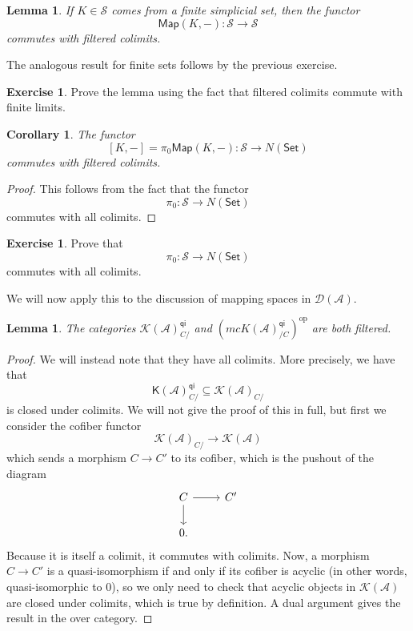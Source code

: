 \documentclass[10pt, oneside]{memoir}
\newtheorem{cor}[thm]{Corollary}
\newtheorem{lem}[thm]{Lemma}
\theoremstyle{definition}
\newtheorem{exer}[thm]{Exercise}
\theoremstyle{remark}
\theoremstyle{plain}
\theoremstyle{definition}
\theoremstyle{remark}
\newcommand{\mc}[1]{\mathcal{#1}}
\newcommand{\ms}[1]{\mathsf{#1}}
\newcommand{\1}{\mathbf{1}}
\newcommand{\2}{\mathbf{2}}
\newcommand{\3}{\mathbf{3}}
\DeclareMathOperator{\op}{op}
\begin{document}
\begin{lem}
    If $K \in \mc{S}$ comes from a finite simplicial set, then the functor
    \[ \ms{Map}(K, -) \colon \mc{S} \to \mc{S} \]
    commutes with filtered colimits.
\end{lem}

The analogous result for finite sets follows by the previous exercise.

\begin{exer}
    Prove the lemma using the fact that filtered colimits commute with finite limits.
\end{exer}

\begin{cor}
    The functor
    \[ [K,-] = \pi_0 \ms{Map}(K, -) \colon \mc{S} \to N(\ms{Set}) \]
    commutes with filtered colimits.
\end{cor}

\begin{proof}
    This follows from the fact that the functor
    \[ \pi_0 \colon \mc{S} \to N(\ms{Set}) \]
    commutes with all colimits.
\end{proof}

\begin{exer}
    Prove that
    \[ \pi_0 \colon \mc{S} \to N(\ms{Set}) \]
    commutes with all colimits.
\end{exer}

We will now apply this to the discussion of mapping spaces in $\mc{D}(\mc{A})$.

\begin{lem}
    The categories $\mc{K}(\mc{A})_{C/}^{\ms{qi}}$ and $(mc{K}(\mc{A})_{/C}^{\ms{qi}})^{\op}$ are both filtered.
\end{lem}

\begin{proof}
    We will instead note that they have all colimits. More precisely, we have that
    \[ \ms{K}(\mc{A})_{C/}^{\ms{qi}} \subseteq \mc{K}(\mc{A})_{C/} \]
    is closed under colimits. We will not give the proof of this in full, but first we consider the cofiber functor
    \[ \mc{K}(\mc{A})_{C/} \to \mc{K}(\mc{A}) \]
    which sends a morphism $C \to C'$ to its cofiber, which is the pushout of the diagram
    \begin{equation*}
    \begin{tikzcd}
        C \ar{r} \ar{d} & C' \\
        0.
    \end{tikzcd}
    \end{equation*}
    Because it is itself a colimit, it commutes with colimits. Now, a morphism $C \to C'$ is a quasi-isomorphism if and only if its cofiber is acyclic (in other words, quasi-isomorphic to $0$), so we only need to check that acyclic objects in $\mc{K}(\mc{A})$ are closed under colimits, which is true by definition. A dual argument gives the result in the over category.
\end{proof}
\end{document}
